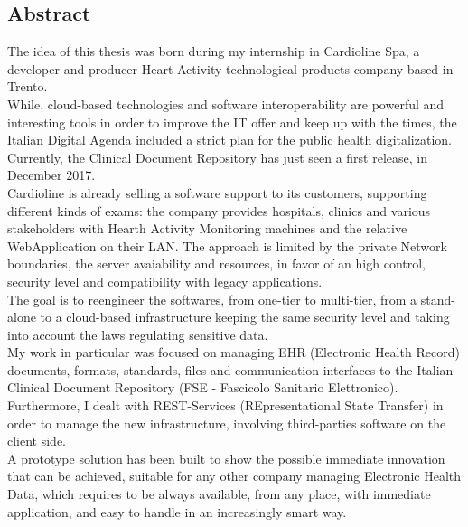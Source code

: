\thispagestyle{empty}
\begin{center}
    {\chapter*{Abstract}} %
\end{center}
\label{abstract}

The idea of this thesis was born during my internship in Cardioline Spa, a developer and producer Heart Activity technological products company based in Trento.\\While, cloud-based technologies and software interoperability are powerful and interesting tools in order to improve the IT offer and keep up with the times, the Italian Digital Agenda included a strict plan for the public health digitalization.\\Currently, the Clinical Document Repository has just seen a first release, in December 2017.\\Cardioline is already selling a software support to its customers, supporting different kinds of exams: the company provides hospitals, clinics and various stakeholders with Hearth Activity Monitoring machines and the relative WebApplication on their LAN. The approach is limited by the private Network boundaries, the server avaiability and resources, in favor of an high control, security level and compatibility with legacy applications.\\The goal is to reengineer the softwares, from one-tier to multi-tier, from a stand-alone to a cloud-based infrastructure keeping the same security level and taking into account the laws regulating sensitive data.\\My work in particular was focused on managing EHR (Electronic Health Record) documents, formats, standards, files and communication interfaces to the Italian Clinical Document Repository (FSE - Fascicolo Sanitario Elettronico).\\Furthermore, I dealt with REST-Services (REpresentational State Transfer) in order to manage the new infrastructure, involving third-parties software on the client side.\\A prototype solution has been built to show the possible immediate innovation that can be achieved, suitable for any other company managing Electronic Health Data, which requires to be always available, from any place, with immediate application, and easy to handle in an increasingly smart way.
